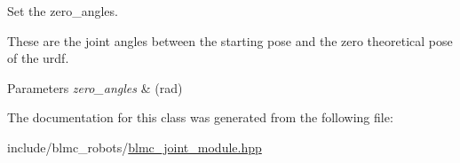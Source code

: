 Set the zero\+\_\+angles. 

These are the joint angles between the starting pose and the zero theoretical pose of the urdf.


\begin{DoxyParams}{Parameters}
{\em zero\+\_\+angles} & (rad) \\
\hline
\end{DoxyParams}


The documentation for this class was generated from the following file\+:\begin{DoxyCompactItemize}
\item 
include/blmc\+\_\+robots/\hyperlink{blmc__joint__module_8hpp}{blmc\+\_\+joint\+\_\+module.\+hpp}\end{DoxyCompactItemize}
